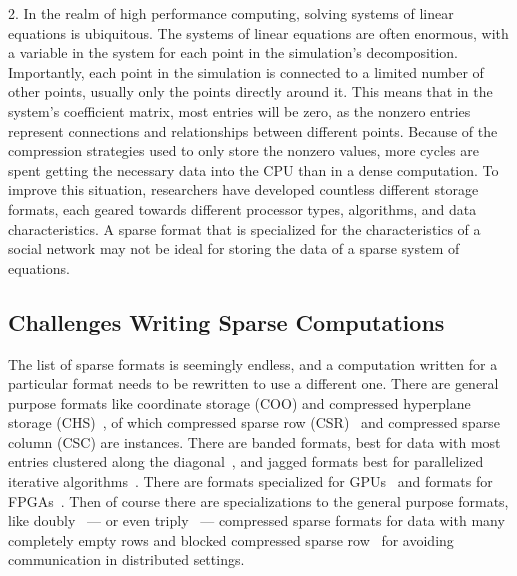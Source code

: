 2. 
In the realm of high performance computing, solving systems of linear equations is ubiquitous.
The systems of linear equations are often enormous, with a variable in the system for each point in the simulation's decomposition.
Importantly, each point in the simulation is connected to a limited number of other points, usually only the points directly around it.
This means that in the system's coefficient matrix, most entries will be zero, as the nonzero entries represent connections and relationships between different points.
Because of the compression strategies used to only store the nonzero values, more cycles are spent getting the necessary data into the CPU than in a dense computation.
To improve this situation, researchers have developed countless different storage formats, each geared towards different processor types, algorithms, and data characteristics.
A sparse format that is specialized for the characteristics of a social network may not be ideal for storing the data of a sparse system of equations.

\subsection{Challenges Writing Sparse Computations}

The list of sparse formats is seemingly endless, and a computation written for a particular format needs to be rewritten to use a different one.
There are general purpose formats like coordinate storage (COO) and compressed hyperplane storage (CHS)~\cite{ahmed2000compiling}, of which compressed sparse row (CSR)~\cite{gustavson1972some} and compressed sparse column (CSC) are instances.
There are banded formats, best for data with most entries clustered along the diagonal~\cite{jennings1966compact}, and jagged formats best for parallelized iterative algorithms~\cite{saad1989krylov,montagne2004optimal}.
There are formats specialized for GPUs~\cite{fan2004gpu,bell2009implementing,bell2008efficient,monakov2010automatically} and formats for FPGAs~\cite{sun2007sparse,kestur2012towards,fowers2014high}.
Then of course there are specializations to the general purpose formats, like doubly~\cite{buluc2008representation} --- or even triply~\cite{mofrad2019efficient} --- compressed sparse formats for data with many completely empty rows and blocked compressed sparse row~\cite{vuduc2005fast} for avoiding communication in distributed settings.

